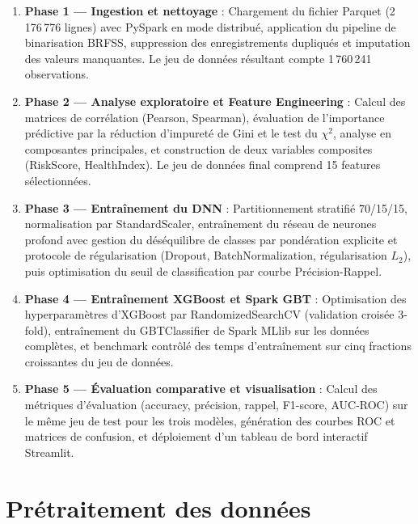 \begin{enumerate}
    \item \textbf{Phase 1 — Ingestion et nettoyage} : Chargement du fichier Parquet (2\,176\,776 lignes) avec PySpark en mode distribué, application du pipeline de binarisation BRFSS, suppression des enregistrements dupliqués et imputation des valeurs manquantes. Le jeu de données résultant compte 1\,760\,241 observations.

    \item \textbf{Phase 2 — Analyse exploratoire et Feature Engineering} : Calcul des matrices de corrélation (Pearson, Spearman), évaluation de l'importance prédictive par la réduction d'impureté de Gini et le test du $\chi^2$, analyse en composantes principales, et construction de deux variables composites (RiskScore, HealthIndex). Le jeu de données final comprend 15 features sélectionnées.

    \item \textbf{Phase 3 — Entraînement du DNN} : Partitionnement stratifié 70/15/15, normalisation par StandardScaler, entraînement du réseau de neurones profond avec gestion du déséquilibre de classes par pondération explicite et protocole de régularisation (Dropout, BatchNormalization, régularisation $L_2$), puis optimisation du seuil de classification par courbe Précision-Rappel.

    \item \textbf{Phase 4 — Entraînement XGBoost et Spark GBT} : Optimisation des hyperparamètres d'XGBoost par RandomizedSearchCV (validation croisée 3-fold), entraînement du GBTClassifier de Spark MLlib sur les données complètes, et benchmark contrôlé des temps d'entraînement sur cinq fractions croissantes du jeu de données.

    \item \textbf{Phase 5 — Évaluation comparative et visualisation} : Calcul des métriques d'évaluation (accuracy, précision, rappel, F1-score, AUC-ROC) sur le même jeu de test pour les trois modèles, génération des courbes ROC et matrices de confusion, et déploiement d'un tableau de bord interactif Streamlit.
\end{enumerate}

\section{Prétraitement des données}

